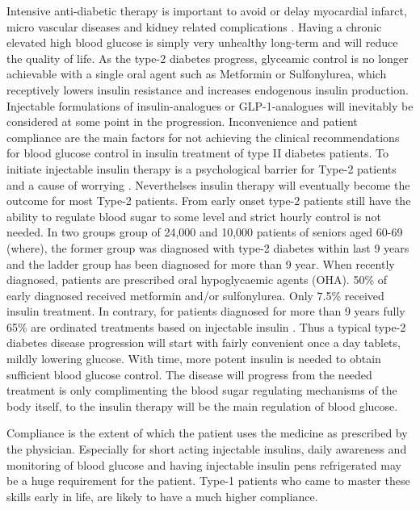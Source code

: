 Intensive anti-diabetic therapy is important to avoid or delay myocardial infarct, micro vascular diseases and kidney related complications \cite{holman,boussageon2011effect,gaede2008effect}. Having a chronic elevated high blood glucose is simply very unhealthy long-term and will reduce the quality of life. As the type-2 diabetes progress, glyceamic control is no longer achievable with a single oral agent such as Metformin or Sulfonylurea, which receptively lowers insulin resistance and increases endogenous insulin production. Injectable formulations of insulin-analogues or GLP-1-analogues will inevitably be considered at some point in the progression. Inconvenience and patient compliance are the main factors for not achieving the clinical recommendations for blood glucose control in insulin treatment of type II diabetes patients. To initiate injectable insulin therapy is a psychological barrier for Type-2 patients and a cause of worrying \cite{korytkowski2002oral}. Neverthelses insulin therapy will eventually become the outcome for most Type-2 patients. From early onset type-2 patients still have the ability to regulate blood sugar to some level and strict hourly control is not needed. In two groups group of 24,000 and 10,000 patients of seniors aged 60-69 (where), the former group was diagnosed with type-2 diabetes within last 9 years and the ladder group has been diagnosed for more than 9 year. When recently diagnosed, patients are prescribed oral hypoglycaemic agents (OHA). 50\% of early diagnosed received metformin and/or sulfonylurea. Only 7.5\% received insulin treatment. In contrary, for patients diagnosed for more than 9 years fully 65\% are ordinated treatments based on injectable insulin \cite{Elbert2014rates}. Thus a typical type-2 diabetes disease progression will start with fairly convenient once a day tablets, mildly lowering glucose. With time, more potent insulin is needed to obtain sufficient blood glucose control. The disease will progress from the needed treatment is only complimenting the blood sugar regulating mechanisms of the body itself, to the insulin therapy will be the main regulation of blood glucose.

Compliance is the extent of which the patient uses the medicine as prescribed by the physician. Especially for short acting injectable insulins, daily awareness and monitoring of blood glucose and having injectable insulin pens refrigerated may be a huge requirement for the patient. Type-1 patients who came to master these skills early in life, are likely to have a much higher compliance.

